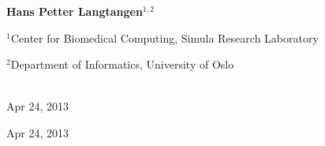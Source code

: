 \documentclass[%
oneside,                 %
final,                   %
10pt]{article}
\begin{document}
\begin{center}

\begin{center}
{\bf Hans Petter Langtangen${}^{1, 2}$} \\ [0mm]
\end{center}

\begin{center}
\centerline{{\small ${}^1$Center for Biomedical Computing, Simula Research Laboratory}}
\centerline{{\small ${}^2$Department of Informatics, University of Oslo}}
\end{center}




\date{Apr 24, 2013}
\maketitle


\ \\ [10mm]
{\large\textsf{Apr 24, 2013}}

\end{center}
\vfill
\clearpage


\begin{center}
Apr 24, 2013
\end{center}

\vspace{1cm}

\end{document}
